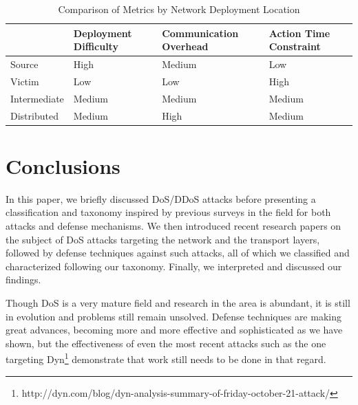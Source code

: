 \documentclass[conference]{IEEEtran}
\begin{document}

{
\tabulinesep=1mm
\begin{table}[!htb]
  \centering
  \begin{tabu} to 0.5\textwidth {| X[1,r] || X[1,c] | X[1,c] | X[1,c] |}
     \hline
      & Deployment Difficulty & Communication Overhead & Action Time Constraint \\\hline\hline
     Source       & High   & Medium & Low    \\\hline
     Victim       & Low    & Low    & High   \\\hline
     Intermediate & Medium & Medium & Medium \\\hline
     Distributed  & Medium & High   & Medium \\\hline
  \end{tabu}
  \smallskip
  \caption{Comparison of Metrics by Network Deployment Location}
  \label{tab:defense}
\end{table}
}

\section{Conclusions}
In this paper, we briefly discussed DoS/DDoS attacks before presenting a classification and taxonomy inspired by previous surveys in the field for both attacks and defense mechanisms. We then introduced recent research papers on the subject of DoS attacks targeting the network and the transport layers, followed by defense techniques against such attacks, all of which we classified and characterized following our taxonomy. Finally, we interpreted and discussed our findings.

Though DoS is a very mature field and research in the area is abundant, it is still in evolution and problems still remain unsolved. Defense techniques are making great advances, becoming more and more effective and sophisticated as we have shown, but the effectiveness of even the most recent attacks such as the one targeting Dyn\footnote{http://dyn.com/blog/dyn-analysis-summary-of-friday-october-21-attack/} demonstrate that work still needs to be done in that regard.



\end{document}
